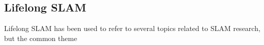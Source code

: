 \subsection{Lifelong SLAM}

Lifelong SLAM has been used to refer to several topics related to SLAM research, but the common theme 